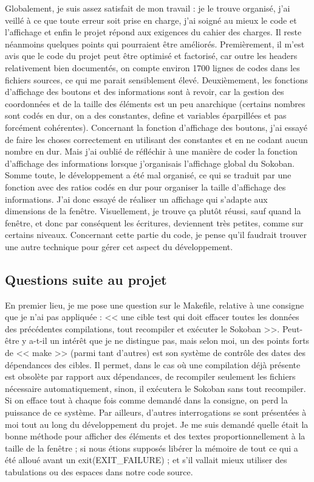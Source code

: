\documentclass[11pt]{article}
\begin{document}
Globalement, je suis assez satisfait de mon travail : je le trouve organisé,
j'ai veillé à ce que toute erreur soit prise en charge, j'ai soigné au mieux le
code et l'affichage et enfin le projet répond aux exigences du cahier des
charges. Il reste néanmoins quelques points qui pourraient être améliorés.
Premièrement, il m'est avis que le code du projet peut être optimisé et
factorisé, car outre les headers relativement bien documentés, on compte environ
1700 lignes de codes dans les fichiers sources, ce qui me parait sensiblement
élevé.  Deuxièmement, les fonctions d'affichage des boutons et des informations
sont à revoir, car la gestion des coordonnées et de la taille des éléments est
un peu anarchique (certains nombres sont codés en dur, on a des constantes,
define et variables éparpillées et pas forcément cohérentes).  Concernant la
fonction d'affichage des boutons, j'ai essayé de faire les choses correctement
en utilisant des constantes et en ne codant aucun nombre en dur.  Mais j'ai
oublié de réfléchir à une manière de coder la fonction d'affichage des
informations lorsque j'organisais l'affichage global du Sokoban. Somme toute, le
développement a été mal organisé, ce qui se traduit par une fonction avec des
ratios codés en dur pour organiser la taille d'affichage des informations.  J'ai
donc essayé de réaliser un affichage qui s'adapte aux dimensions de la fenêtre.
Visuellement, je trouve ça plutôt réussi, sauf quand la fenêtre, et donc par
conséquent les écritures, deviennent très petites, comme sur certains niveaux.
Concernant cette partie du code, je pense qu'il faudrait trouver une autre
technique pour gérer cet aspect du développement.

\subsection{Questions suite au projet}

En premier lieu, je me pose une question sur le Makefile, relative à une
consigne que je n'ai pas appliquée : << une cible test qui doit effacer toutes
les données des précédentes compilations, tout recompiler et exécuter le Sokoban
>>. Peut-être y a-t-il un intérêt que je ne distingue pas, mais selon moi, un
des points forts de << make >> (parmi tant d'autres) est son système de contrôle
des dates des dépendances des cibles. Il permet, dans le cas où une compilation
déjà présente est obsolète par rapport aux dépendances, de recompiler seulement
les fichiers nécessaire automatiquement, sinon, il exécutera le Sokoban sans
tout recompiler. Si on efface tout à chaque fois comme demandé dans la consigne,
on perd la puissance de ce système.  Par ailleurs, d'autres interrogations se
sont présentées à moi tout au long du développement du projet.  Je me suis
demandé quelle était la bonne méthode pour afficher des éléments et des textes
proportionnellement à la taille de la fenêtre ; si nous étions supposés libérer
la mémoire de tout ce qui a été alloué avant un exit(EXIT\_FAILURE) ; et s'il
vallait mieux utiliser des tabulations ou des espaces dans notre code source.
\end{document}
